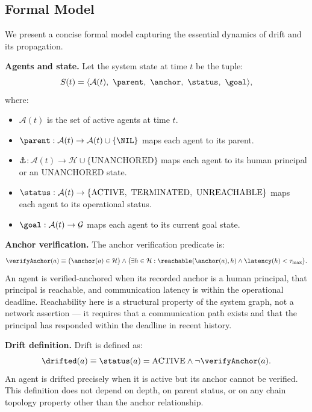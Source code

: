 \subsection{Formal Model}
\label{sec:rs-formal-model}

We present a concise formal model capturing the essential dynamics of drift and its propagation.

\medskip
\noindent\textbf{Agents and state.} Let the system state at time $t$ be the tuple:
\begin{equation}
S(t) = \langle \mathcal{A}(t),\ \parent,\ \anchor,\ \status,\ \goal \rangle,
\label{eq:system-state}
\end{equation}
where:
\begin{itemize}
    \item $\mathcal{A}(t)$ is the set of active agents at time $t$.
    \item $\parent: \mathcal{A}(t) \rightarrow \mathcal{A}(t) \cup \{\NIL\}$ maps each agent to its parent.
    \item $\anchor: \mathcal{A}(t) \rightarrow \mathcal{H} \cup \{\text{UNANCHORED}\}$ maps each agent to its human principal or an UNANCHORED state.
    \item $\status: \mathcal{A}(t) \rightarrow \{\text{ACTIVE},\ \text{TERMINATED},\ \text{UNREACHABLE}\}$ maps each agent to its operational status.
    \item $\goal: \mathcal{A}(t) \rightarrow \mathcal{G}$ maps each agent to its current goal state.
\end{itemize}

\medskip
\noindent\textbf{Anchor verification.} The anchor verification predicate is:
\begin{equation}
\verifyAnchor(a) \equiv \bigl(\anchor(a) \in \mathcal{H}\bigr) \land \bigl(\exists h \in \mathcal{H}: \reachable(\anchor(a), h) \land \latency(h) < \tau_{\max}\bigr).
\label{eq:anchor-verification}
\end{equation}
An agent is verified-anchored when its recorded anchor is a human principal, that principal is reachable, and communication latency is within the operational deadline. Reachability here is a structural property of the system graph, not a network assertion — it requires that a communication path exists and that the principal has responded within the deadline in recent history.

\medskip
\noindent\textbf{Drift definition.} Drift is defined as:
\begin{equation}
\drifted(a) \equiv \status(a) = \text{ACTIVE} \land \neg \verifyAnchor(a).
\label{eq:drift-definition}
\end{equation}
An agent is drifted precisely when it is active but its anchor cannot be verified. This definition does not depend on depth, on parent status, or on any chain topology property other than the anchor relationship.

